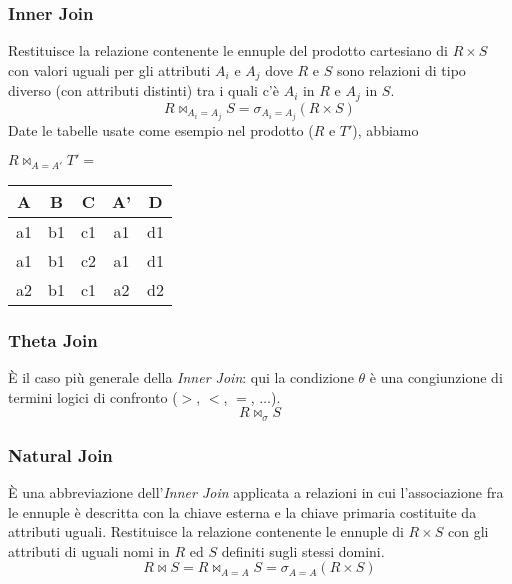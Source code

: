 \subsubsection{Inner Join}
Restituisce la relazione contenente le ennuple del prodotto cartesiano di $R \times S$ con valori uguali per gli attributi $A_i$ e $A_j$ dove $R$ e $S$ sono relazioni di tipo diverso (con attributi distinti) tra i quali c’è $A_i$ in $R$ e $A_j$ in $S$.
\begin{equation}
	R \Join_{A_i = A_j}S = \sigma_{A_i=A_j}(R \times S)
\end{equation}
Date le tabelle usate come esempio nel prodotto ($R$ e $T'$), abbiamo
\begin{table}[!h]
	\centering
	$R \Join_{A=A'}T' =$ \hspace{10pt}
	\begin{tabular}{|c|c|c|c|c|}
		\hline
		A & B & C & A' & D \\
		\hline
		a1 & b1 & c1 & a1 & d1 \\
		\hline
		a1 & b1 & c2& a1 & d1 \\
		\hline
		a2 & b1 & c1 & a2 & d2 \\
		\hline
	\end{tabular}
\end{table}

\subsubsection{Theta Join}
È il caso più generale della \textit{Inner Join}: qui la condizione $\theta$ è una congiunzione di termini logici di confronto ($>$, $<$, $=$, $\ldots$).
\begin{equation}
	R \Join_\sigma S
\end{equation}

\subsubsection{Natural Join}
È una abbreviazione dell’\textit{Inner Join} applicata a relazioni in cui l’associazione fra le ennuple è
descritta con la chiave esterna e la chiave primaria costituite da attributi uguali. Restituisce la relazione contenente le ennuple di $R \times S$ con gli attributi di uguali nomi in $R$ ed $S$ definiti sugli stessi domini. 
\begin{equation}
	R \Join S = R \Join_{A=A}S = \sigma_{A=A}(R \times S)
\end{equation}

